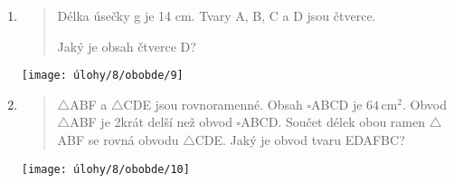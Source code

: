 \begin{enumerate}
\begin{minipage}[t]{\linewidth}
    \end{minipage}

    \item
    \begin{minipage}[t]{\linewidth}
        \begin{quote}
            Délka úsečky g je 14 cm. Tvary A, B, C a D jsou čtverce.

            Jaký je obsah čtverce D?
        \end{quote}
        \centering
        \texttt{[image: úlohy/8/obobde/9]}

    \end{minipage}

    \item
    \begin{minipage}[t]{\linewidth}
        \begin{quote}
        	$\triangle$ABF a $\triangle$CDE jsou rovnoramenné.
            Obsah $\square$ABCD je $64\,\text{cm}^{2}$.
            Obvod $\triangle$ABF je 2krát delší než obvod $\square$ABCD. Součet délek obou ramen $\triangle$ABF se rovná obvodu $\triangle$CDE. Jaký je obvod tvaru EDAFBC?
        \end{quote}
        \centering
        \texttt{[image: úlohy/8/obobde/10]}

    \end{minipage}
\end{enumerate}


\newpage


